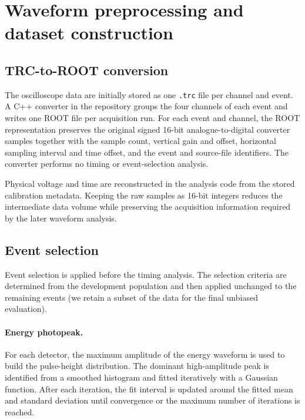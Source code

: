 \section{Waveform preprocessing and dataset construction}\label{sec:preprocessing}

\subsection{TRC-to-ROOT conversion}

The oscilloscope data are initially stored as one \texttt{.trc} file per channel and event. 
A C++ converter in the repository groups the four channels of each event and writes one ROOT file per acquisition run. 
For each event and channel, the ROOT representation preserves the original signed 16-bit analogue-to-digital converter 
samples together with the sample count, vertical gain and offset, horizontal sampling interval and time offset, 
and the event and source-file identifiers. The converter performs no timing or event-selection analysis.

Physical voltage and time are reconstructed in the analysis code from the stored calibration metadata. 
Keeping the raw samples as 16-bit integers reduces the intermediate data volume while preserving the acquisition information 
required by the later waveform analysis.

\subsection{Event selection}

Event selection is applied before the timing analysis. 
The selection criteria are determined from the development population and then applied unchanged to the remaining events
(we retain a subset of the data for the final unbiased evaluation).

\paragraph{Energy photopeak.}

For each detector, the maximum amplitude of the energy waveform is used to build the pulse-height distribution. The dominant high-amplitude peak 
is identified from a smoothed histogram and fitted iteratively with a Gaussian function. 
After each iteration, the fit interval is updated around the fitted mean and standard deviation until convergence or the maximum number of iterations 
is reached.

